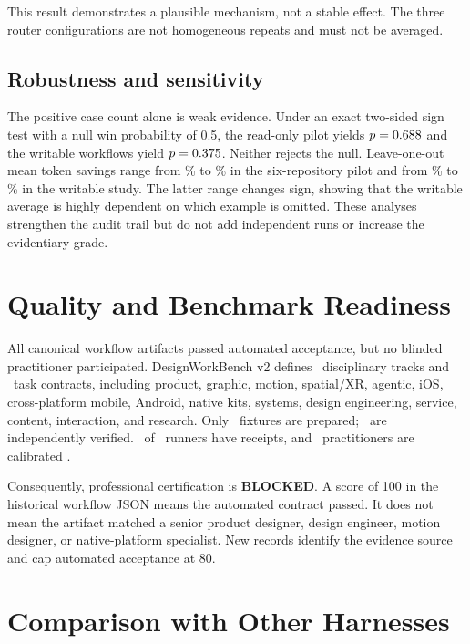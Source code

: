 \documentclass[10pt,twocolumn]{article}
\newcommand{\blocked}{\textcolor{MemiRed}{\textbf{BLOCKED}}}
\begin{document}
This result demonstrates a plausible mechanism, not a stable effect. The three
router configurations are not homogeneous repeats and must not be averaged.

\subsection{Robustness and sensitivity}

The positive case count alone is weak evidence. Under an exact two-sided sign
test with a null win probability of 0.5, the read-only pilot yields
$p=0.688$ and the writable workflows yield $p=0.375$. Neither
rejects the null. Leave-one-out mean token savings range from
\SixRepoLooMin\% to \SixRepoLooMax\% in the six-repository pilot and from
\WorkflowLooMin\% to \WorkflowLooMax\% in the writable study. The latter range
changes sign, showing that the writable average is highly dependent on which
example is omitted. These analyses strengthen the audit trail but do not add
independent runs or increase the evidentiary grade.

\section{Quality and Benchmark Readiness}

All canonical workflow artifacts passed automated acceptance, but no blinded
practitioner participated. DesignWorkBench v2 defines \BenchmarkTracks\
disciplinary tracks and \BenchmarkTaskContracts\ task contracts, including
product, graphic, motion, spatial/XR, agentic, iOS, cross-platform mobile,
Android, native kits, systems, design engineering, service, content,
interaction, and research. Only \BenchmarkPreparedFixtures\ fixtures are
prepared; \BenchmarkVerifiedFixtures\ are independently verified.
\BenchmarkVerifiedRunners\ of \BenchmarkRequiredRunners\ runners have receipts,
and \BenchmarkPractitioners\ practitioners are calibrated
\cite{memi2026designworkbench}.

Consequently, professional certification is \blocked. A score of 100 in the
historical workflow JSON means the automated contract passed. It does not mean
the artifact matched a senior product designer, design engineer, motion
designer, or native-platform specialist. New records identify the evidence
source and cap automated acceptance at 80.

\section{Comparison with Other Harnesses}
\end{document}
